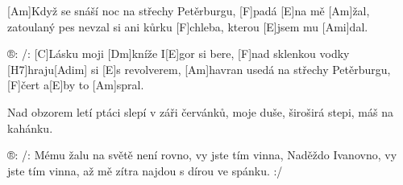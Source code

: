 
[Am]Když se snáší noc na střechy Petěrburgu, [F]padá [E]na mě [Am]\null žal,
zatoulaný pes nevzal si ani kůrku [F]chleba, kterou [E]jsem mu [Ami]dal.

®: /: [C]Lásku moji [Dm]kníže I[E]gor si bere,
[F]nad sklenkou vodky [H7]hraju[Adim] si [E]s revolverem,
[Am]havran usedá na střechy Petěrburgu, [F]\null čert a[E]by to [Am]spral.

Nad obzorem letí ptáci slepí v záři červánků,
moje duše, široširá stepi, máš na kahánku.

®: /: Mému žalu na světě není rovno,
vy jste tím vinna, Naděždo Ivanovno,
vy jste tím vinna, až mě zítra najdou s dírou ve spánku. :/



